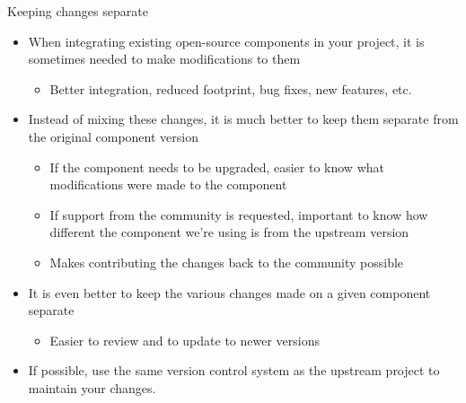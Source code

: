 \begin{frame}{Keeping changes separate}
  \begin{itemize}
  \item When integrating existing open-source components in your
    project, it is sometimes needed to make modifications to them
    \begin{itemize}
    \item Better integration, reduced footprint, bug fixes, new
      features, etc.
    \end{itemize}
  \item Instead of mixing these changes, it is much better to keep
    them separate from the original component version
    \begin{itemize}
    \item If the component needs to be upgraded, easier to know what
      modifications were made to the component
    \item If support from the community is requested, important to
      know how different the component we're using is from the
      upstream version
    \item Makes contributing the changes back to the community
      possible
    \end{itemize}
  \item It is even better to keep the various changes made on a given
    component separate
    \begin{itemize}
    \item Easier to review and to update to newer versions
    \end{itemize}
  \item If possible, use the same version control system as the upstream
    project to maintain your changes.
  \end{itemize}
\end{frame}
